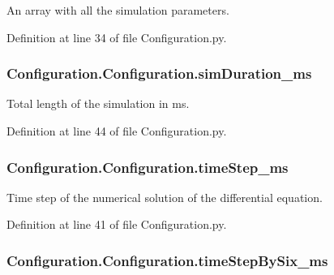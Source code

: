 An array with all the simulation parameters. 



Definition at line 34 of file Configuration.\-py.

\hypertarget{class_configuration_1_1_configuration_aea238884fe3daa1287aa069f35d4ad3e}{
\subsubsection[{sim\-Duration\-\_\-ms}]{\setlength{\rightskip}{0pt plus 5cm}Configuration.\-Configuration.\-sim\-Duration\-\_\-ms}}\label{class_configuration_1_1_configuration_aea238884fe3daa1287aa069f35d4ad3e}


Total length of the simulation in ms. 



Definition at line 44 of file Configuration.\-py.

\hypertarget{class_configuration_1_1_configuration_a6379aaa6e54523ca81e3713d1846679b}{
\subsubsection[{time\-Step\-\_\-ms}]{\setlength{\rightskip}{0pt plus 5cm}Configuration.\-Configuration.\-time\-Step\-\_\-ms}}\label{class_configuration_1_1_configuration_a6379aaa6e54523ca81e3713d1846679b}


Time step of the numerical solution of the differential equation. 



Definition at line 41 of file Configuration.\-py.

\hypertarget{class_configuration_1_1_configuration_aa49387a016f5d528136ab5812821cb99}{
\subsubsection[{time\-Step\-By\-Six\-\_\-ms}]{\setlength{\rightskip}{0pt plus 5cm}Configuration.\-Configuration.\-time\-Step\-By\-Six\-\_\-ms}}\label{class_configuration_1_1_configuration_aa49387a016f5d528136ab5812821cb99}


